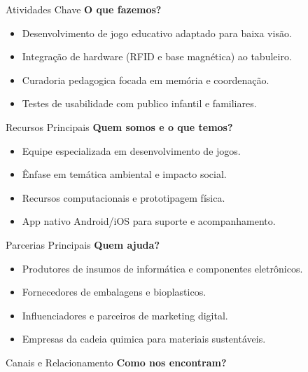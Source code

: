 \documentclass[final]{beamer}
\newlength{\colwidth}
\begin{document}
\begin{frame}[t]
\begin{columns}[t]
\begin{column}{\colwidth}

  \begin{block}{Atividades Chave}
    \textbf{O que fazemos?}

    \begin{itemize}
      \item Desenvolvimento de jogo educativo adaptado para baixa visão.
      \item Integração de hardware (RFID e base magnética) ao tabuleiro.
      \item Curadoria pedagogica focada em memória e coordenação.
      \item Testes de usabilidade com publico infantil e familiares.
    \end{itemize}
  \end{block}

  \begin{block}{Recursos Principais}
    \textbf{Quem somos e o que temos?}

    \begin{itemize}
      \item Equipe especializada em desenvolvimento de jogos.
      \item Ênfase em temática ambiental e impacto social.
      \item Recursos computacionais e prototipagem física.
      \item App nativo Android/iOS para suporte e acompanhamento.
    \end{itemize}
  \end{block}

  \begin{block}{Parcerias Principais}
    \textbf{Quem ajuda?}

    \begin{itemize}
      \item Produtores de insumos de informática e componentes eletrônicos.
      \item Fornecedores de embalagens e bioplasticos.
      \item Influenciadores e parceiros de marketing digital.
      \item Empresas da cadeia quimica para materiais sustentáveis.
    \end{itemize}
  \end{block}

  \begin{exampleblock}{Canais e Relacionamento}
    \textbf{Como nos encontram?}


\end{exampleblock}
\end{column}
\end{columns}
\end{frame}
\end{document}
